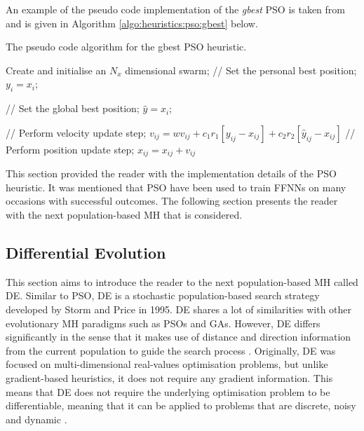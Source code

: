 An example of the pseudo code implementation of the \textit{gbest} \ac{PSO} is taken from \cite{ref:engelbrecht:2007} and is given in Algorithm \ref{algo:heuristics:pso:gbest} below.

\begin{algorithm}[H]
      \caption{The pseudo code algorithm for the gbest \ac{PSO} heuristic.}
      \label{algo:heuristics:pso:gbest}
      \begin{algorithmic}
            \State Create and initialise an $N_{x}$ dimensional swarm;
            \State // Set the personal best position;
            \State $y_{i} = x_{i}$;
            \EndIf

            \State // Set the global best position;
            \State $\hat{y} = x_{i}$;
            \EndIf
            \EndFor

            \State // Perform velocity update step;
            \State $v_{ij} = wv_{ij} + c_{1}r_{1}[y_{ij} - x_{ij}] + c_{2}r_{2}[\hat{y}_{ij} - x_{ij}]$
            \State // Perform position update step;
            \State $x_{ij} = x_{ij} + v_{ij}$
            \EndFor
            \EndWhile
      \end{algorithmic}
\end{algorithm}

This section provided the reader with the implementation details of the \ac{PSO} heuristic. It was mentioned that \ac{PSO} have been used to train \acp{FFNN} on many occasions with successful outcomes. The following section presents the reader with the next population-based \ac{MH} that is considered.

\subsection{Differential Evolution}
\label{sec:heuristics:mh:de}

This section aims to introduce the reader to the next population-based \ac{MH} called \acl{DE}. Similar to \ac{PSO}, \Ac{DE} is a stochastic population-based search strategy developed by Storm and Price \cite{ref:price:2006} in 1995. \Ac{DE} shares a lot of similarities with other evolutionary \ac{MH} paradigms such as \acp{PSO} and \acp{GA}. However, \ac{DE} differs significantly in the sense that it makes use of distance and direction information from the current population to guide the search process \cite{ref:engelbrecht:2007}. Originally, \ac{DE} was focused on multi-dimensional real-values optimisation problems, but unlike gradient-based heuristics, it does not require any gradient information. This means that \ac{DE} does not require the underlying optimisation problem to be differentiable, meaning that it can be applied to problems that are discrete, noisy and dynamic \cite{ref:rocca:2011}.

